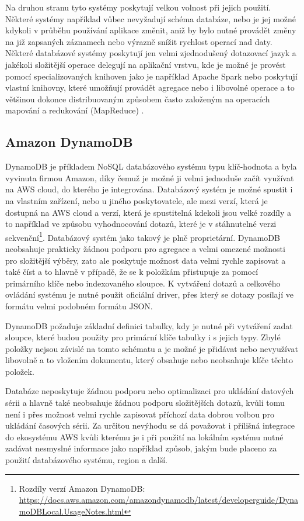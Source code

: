 Na druhou stranu tyto systémy poskytují velkou volnost při jejich použití. Některé systémy například vůbec nevyžadují schéma databáze, nebo je jej možné kdykoli v průběhu používání aplikace změnit, aniž by bylo nutné provádět změny na již zapsaných záznamech nebo výrazně snížit rychlost operací nad daty. Některé databázové systémy poskytují jen velmi zjednodušený dotazovací jazyk a jakékoli složitější operace delegují na aplikační vrstvu, kde je možné je provést pomocí specializovaných knihoven jako je například Apache Spark \cite{meng2016mllib} nebo poskytují vlastní knihovny, které umožňují provádět agregace nebo i libovolné operace a to většinou dokonce distribuovaným způsobem často založeným na operacích mapování a redukování (MapReduce) \cite{10.1145/1327452.1327492}.

\subsection{Amazon DynamoDB}
DynamoDB je příkladem NoSQL databázového systému typu klíč-hodnota a byla vyvinuta firmou Amazon, díky čemuž je možné ji velmi jednoduše začít využívat na AWS cloud, do kterého je integrována. Databázový systém je možné spustit i na vlastním zařízení, nebo u jiného poskytovatele, ale mezi verzí, která je dostupná na AWS cloud a verzí, která je spustitelná kdekoli jsou velké rozdíly a to například ve způsobu vyhodnocování dotazů, které je v stáhnutelné verzi sekvenční\footnote{Rozdíly verzí Amazon DynamoDB: \url{https://docs.aws.amazon.com/amazondynamodb/latest/developerguide/DynamoDBLocal.UsageNotes.html}}. Databázový systém jako takový je plně proprietární. DynamoDB neobsahuje prakticky žádnou podporu pro agregace a velmi omezené možnosti pro složitější výběry, zato ale poskytuje možnost data velmi rychle zapisovat a také číst a to hlavně v případě, že se k položkám přistupuje za pomocí primárního klíče nebo indexovaného sloupce. K vytváření dotazů a celkového ovládání systému je nutné použít oficiální driver, přes který se dotazy posílají ve formátu velmi podobném formátu JSON.

DynamoDB požaduje základní definici tabulky, kdy je nutné při vytváření zadat sloupce, které budou použity pro primární klíče tabulky i s jejich typy. Zbylé položky nejsou závislé na tomto schématu a je možné je přidávat nebo nevyužívat libovolně a to vložením dokumentu, který obsahuje nebo neobsahuje klíče těchto položek. 

Databáze neposkytuje žádnou podporu nebo optimalizaci pro ukládání datových sérii a hlavně také neobsahuje žádnou podporu složitějších dotazů, kvůli tomu není i přes možnost velmi rychle zapisovat příchozí data dobrou volbou pro ukládání časových sérii. Za určitou nevýhodu se dá považovat i přílišná integrace do ekosystému AWS kvůli kterému je i při použití na lokálním systému nutné zadávat nesmyslné informace jako například způsob, jakým bude placeno za použití databázového systému, region a další.

